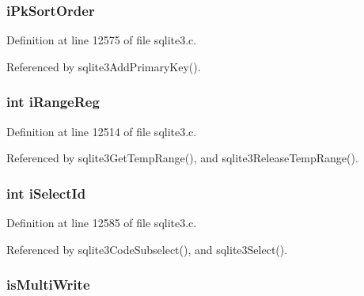 \subsubsection[{i\+Pk\+Sort\+Order}]{ i\+Pk\+Sort\+Order}\label{struct_parse_a3813b936696feff0b9e68c70c22fc0ea}


Definition at line 12575 of file sqlite3.\+c.



Referenced by sqlite3\+Add\+Primary\+Key().

\hypertarget{struct_parse_ac5a9ccf4d81b2a452e159a9753d8385d}{}
\subsubsection[{i\+Range\+Reg}]{\setlength{\rightskip}{0pt plus 5cm}int i\+Range\+Reg}\label{struct_parse_ac5a9ccf4d81b2a452e159a9753d8385d}


Definition at line 12514 of file sqlite3.\+c.



Referenced by sqlite3\+Get\+Temp\+Range(), and sqlite3\+Release\+Temp\+Range().

\hypertarget{struct_parse_a859d1cc55df407e1fb09827e8feed3af}{}
\subsubsection[{i\+Select\+Id}]{\setlength{\rightskip}{0pt plus 5cm}int i\+Select\+Id}\label{struct_parse_a859d1cc55df407e1fb09827e8feed3af}


Definition at line 12585 of file sqlite3.\+c.



Referenced by sqlite3\+Code\+Subselect(), and sqlite3\+Select().

\hypertarget{struct_parse_af41df25710d2a2fab855aff36da94eab}{}
\subsubsection[{is\+Multi\+Write}]{ is\+Multi\+Write}\label{struct_parse_af41df25710d2a2fab855aff36da94eab}


